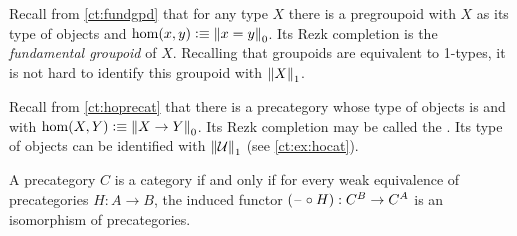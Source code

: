 \documentclass[hott-all.tex]{subfiles}
\begin{document}
\begin{eg}
  Recall from \cref{ct:fundgpd} that for any type $X$ there is a pregroupoid with $X$ as its type of objects and $\hom(x,y) \defeq \pizero{x=y}$.
  Its Rezk completion is the \emph{fundamental groupoid} of $X$.
  Recalling that groupoids are equivalent to 1-types, it is not hard to identify this groupoid with $\trunc1X$.
\end{eg}

\begin{eg}
  Recall from \cref{ct:hoprecat} that there is a precategory whose type of objects is \type and with $\hom(X,Y) \defeq \pizero{X\to Y}$.
  Its Rezk completion may be called the .
  Its type of objects can be identified with $\trunc1\type$ (see \cref{ct:ex:hocat}).
\end{eg}


\begin{thm}
  A precategory $C$ is a category if and only if for every weak equivalence of precategories $H:A\to B$, the induced functor $(\blank\circ H):C^B \to C^A$ is an isomorphism of precategories.
\end{thm}
%
%
%
\end{document}
